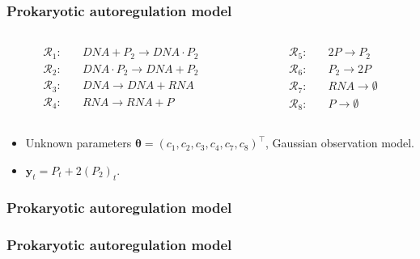 \documentclass{beamer}
\newcommand{\by}{\bm{y}}
\newcommand{\btheta}{\bm{\theta}}
\begin{document}
    \begin{frame}
    \frametitle{Prokaryotic autoregulation model}
    \begin{columns}
        \begin{column}{0.4\textwidth}
            \begin{equation*}
            \begin{split}
            \mathcal{R}_1:\quad & \mathit{DNA} + P_2 \to \mathit{DNA} \cdot P_2 \\
            \mathcal{R}_2:\quad & \mathit{DNA} \cdot P_2 \to \mathit{DNA} + P_2 \\
            \mathcal{R}_3:\quad & \mathit{DNA} \to \mathit{DNA} + \mathit{RNA} \\
            \mathcal{R}_4:\quad & \mathit{RNA} \to \mathit{RNA} + P
            \end{split}
            \end{equation*}
        \end{column}
%
        \begin{column}{0.4\textwidth}
            \begin{equation*}
            \begin{split}
            \mathcal{R}_5:\quad & 2P \to P_2 \\
            \mathcal{R}_6:\quad & P_2 \to 2P \\
            \mathcal{R}_7:\quad & \mathit{RNA} \to \emptyset \\
            \mathcal{R}_8:\quad & P \to \emptyset
            \end{split}
            \end{equation*}
        \end{column}
    \end{columns}

    \begin{itemize}
        \item Unknown parameters $\btheta = \left(c_1, c_2, c_3, c_4, c_7, c_8\right)^\intercal$, Gaussian observation model.
        \item $\by_t = P_t + 2(P_2)_t$.
    \end{itemize}
    \end{frame}

    \begin{frame}
    \frametitle{Prokaryotic autoregulation model}
    \end{frame}

    \begin{frame}
    \frametitle{Prokaryotic autoregulation model}
    \end{frame}
\end{document}
